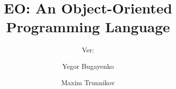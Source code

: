 \documentclass[acmsmall,nonacm,11pt]{acmart}
\title{EO: An Object-Oriented Programming Language}
\subtitle{%
  Ver:
  \texorpdfstring{
    \href{https://github.com/REPOSITORY/releases/tag/0.0.0}
      {\ff{0.0.0}}
  }{0.0.0}
}
\author{Yegor Bugayenko}
\affiliation{\institution{Huawei}\city{Moscow}\country{Russia}}
\author{Maxim Trunnikov}
\affiliation{\institution{Huawei}\city{Moscow}\country{Russia}}
\begin{document}


\maketitle





















{\raggedright

}
\vfill\eject

\appendix


\end{document}
